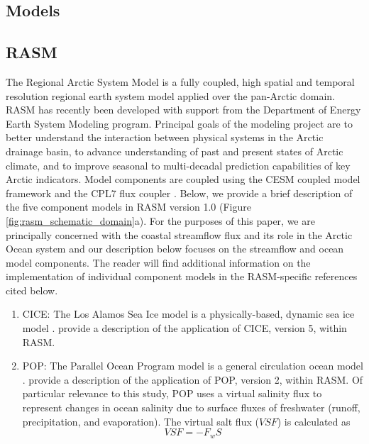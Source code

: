 \documentclass[jgrga, draft]{agutex}
\begin{document}
\begin{article}
\section{Models}
\label{sec:models}

\subsection{RASM}
\label{sec:rasm}
The Regional Arctic System Model is a fully coupled, high spatial and temporal resolution regional earth system model applied over the pan-Arctic domain.
RASM has recently been developed with support from the Department of Energy Earth System Modeling program. %
Principal goals of the modeling project are to better understand the interaction between physical systems in the Arctic drainage basin, to advance understanding of past and present states of Arctic climate, and to improve seasonal to multi-decadal prediction capabilities of key Arctic indicators.
Model components are coupled using the CESM coupled model framework and the CPL7 flux coupler \citep{Craig_2011}. %
Below, we provide a brief description of the five component models in RASM version 1.0 (Figure \ref{fig:rasm_schematic_domain}a). %
For the purposes of this paper, we are principally concerned with the coastal streamflow flux and its role in the Arctic Ocean system and our description below  focuses on the streamflow and ocean model components.
The reader will find additional information on the implementation of individual component models in the RASM-specific references cited below.

\begin{enumerate}
\item CICE: The Los Alamos Sea Ice model is a physically-based, dynamic sea ice model \citep{Hunke_2010}.
\citet{Roberts_2015a} provide a description of the application of CICE, version 5, within RASM.
\item POP: The Parallel Ocean Program model is a general circulation ocean model \citep{Smith_2010}.
\citet{Roberts_2015a} provide a description of the application of POP, version 2, within RASM.
Of particular relevance to this study, POP uses a virtual salinity flux to represent changes in ocean salinity due to surface fluxes of freshwater (runoff, precipitation, and evaporation).
The virtual salt flux ($VSF$) is calculated as
\begin{equation}
  \label{eq:SaltFlux}
  VSF= -F_w S
\end{equation}


\end{enumerate}
\end{article}
\end{document}
